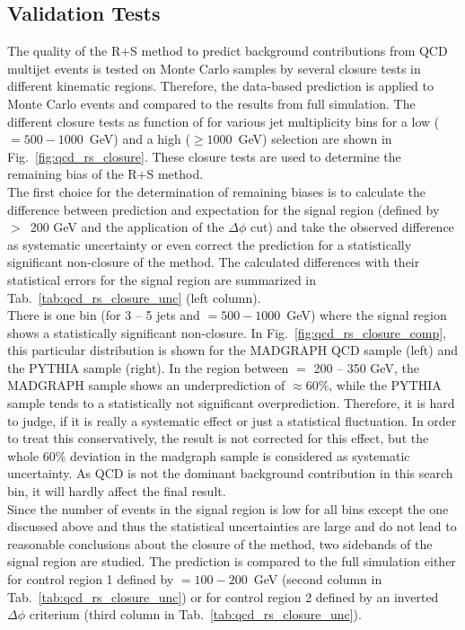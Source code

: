 \subsection{Validation Tests}
\label{subsec:RA2_clsoure}
The quality of the R+S method to predict background contributions from QCD multijet events is tested on Monte Carlo samples by several closure tests in different kinematic regions. Therefore, the data-based prediction is applied to Monte Carlo events and compared to the results from full simulation. The different closure tests as function of \MHT for various jet multiplicity bins for a low \HT ($= 500 - 1000$~GeV) and a high \HT ($\ge 1000$~GeV) selection are shown in Fig.~\ref{fig:qcd_rs_closure}. These closure tests are used to determine the remaining bias of the R+S method. \\
The first choice for the determination of remaining biases is to calculate the difference between prediction and expectation for the signal region (defined by \MHT $>$~200 GeV and the application of the $\Delta \phi$ cut) and take the observed difference as systematic uncertainty or even correct the prediction for a statistically significant non-closure of the method. The calculated differences with their statistical errors for the signal region are summarized in Tab.~\ref{tab:qcd_rs_closure_unc} (left column). \\
There is one bin (for 3 -- 5 jets and \HT $= 500 - 1000$~GeV) where the signal region shows a statistically significant non-closure. In Fig.~\ref{fig:qcd_rs_closure_comp}, this particular distribution is shown for the MADGRAPH QCD sample (left) and the PYTHIA sample (right). In the region between \MHT $=$ 200 -- 350 GeV, the MADGRAPH sample shows an underprediction of $\approx 60\%$, while the PYTHIA sample tends to a statistically not significant overprediction. Therefore, it is hard to judge, if it is really a systematic effect or just a statistical fluctuation. In order to treat this conservatively, the result is not corrected for this effect, but the whole $60\%$ deviation in the madgraph sample is considered as systematic uncertainty. As QCD is not the dominant background contribution in this search bin, it will hardly affect the final result.\\
Since the number of events in the signal region is low for all bins except the one discussed above and thus the statistical uncertainties are large and do not lead to reasonable conclusions about the closure of the method, two sidebands of the signal region are studied. The prediction is compared to the full simulation either for control region 1 defined by \MHT $= 100 - 200$~GeV (second column in Tab.~\ref{tab:qcd_rs_closure_unc}) or for control region 2 defined by an inverted $\Delta \phi$ criterium (third column in Tab.~\ref{tab:qcd_rs_closure_unc}). 
